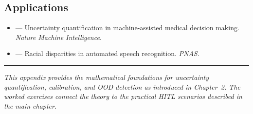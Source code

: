 \subsection*{Applications}
\begin{itemize}
    \item \textcite{begoli2019uncertainty} --- Uncertainty quantification in machine-assisted medical decision making. \emph{Nature Machine Intelligence}.
    \item \textcite{koenecke2020racial} --- Racial disparities in automated speech recognition. \emph{PNAS}.
\end{itemize}

\bigskip
\begin{center}
\rule{0.5\textwidth}{0.4pt}
\end{center}
\bigskip

\noindent\textit{This appendix provides the mathematical foundations for uncertainty quantification, calibration, and OOD detection as introduced in Chapter~2. The worked exercises connect the theory to the practical HITL scenarios described in the main chapter.}
\apxnumoff

